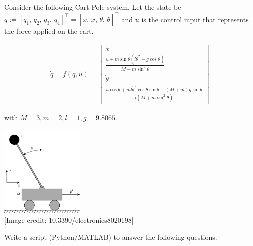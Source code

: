 \begin{problem}[40]
    Consider the following Cart-Pole system. Let the state be $q:= [q_1,\,q_2,\,q_3,\,q_4]^\top = [x,\, \dot{x},\, \theta,\, \dot{\theta}]^\top$ and $u$ is the control input that represents the force applied on the cart.

    \begin{align*}
        \dot{q} = f(q,u) = 
        \begin{bmatrix}
            \dot{x} \\
            \frac{u + m \sin{\theta}(l\dot{\theta}^2-g\cos{\theta})}{M+m \sin^2{\theta}} \\
            \dot{\theta} \\
            \frac{u\cos{\theta} + ml\dot{\theta}^2\cos{\theta}\sin{\theta} - (M+m)g \sin{\theta}}{l(M+m\sin^2{\theta})}
        \end{bmatrix}
    \end{align*}

    with $M=3, m = 2, l=1, g=9.8065$.
     
    \begin{center}
        \includegraphics[width=0.3\textwidth]{cart_pole.png}\\
        \tiny{[Image credit: 10.3390/electronics8020198]}
    \end{center}

    Write a script (Python/MATLAB) to answer the following questions:


\end{problem}
